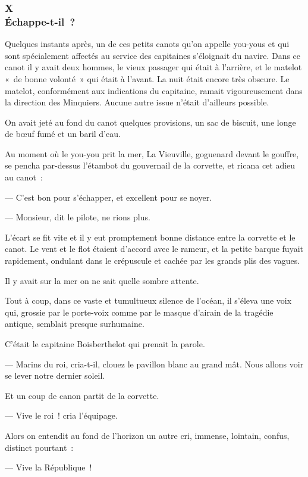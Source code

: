 \documentclass[french,twoside]{book} %
\begin{document}
 \subsubsection[{X. Échappe-t-il ?}]{X \\
Échappe-t-il ?}
\label{p1l2c10}
\noindent Quelques instants après, un de ces petits canots qu’on appelle you-yous et qui sont spécialement affectés au service des capitaines s’éloignait du navire. Dans ce canot il y avait deux hommes, le vieux passager qui était à l’arrière, et le matelot « de bonne volonté » qui était à l’avant. La nuit était encore très obscure. Le matelot, conformément aux indications du capitaine, ramait vigoureusement dans la direction des Minquiers. Aucune autre issue n’était d’ailleurs possible.\par
On avait jeté au fond du canot quelques provisions, un sac de biscuit, une longe de bœuf fumé et un baril d’eau.\par
Au moment où le you-you prit la mer, La Vieuville, goguenard devant le gouffre, se pencha par-dessus l’étambot du gouvernail de la corvette, et ricana cet adieu au canot :\par
— C’est bon pour s’échapper, et excellent pour se noyer.\par
— Monsieur, dit le pilote, ne rions plus.\par
L’écart se fit vite et il y eut promptement bonne distance entre la corvette et le canot. Le vent et  le flot étaient d’accord avec le rameur, et la petite barque fuyait rapidement, ondulant dans le crépuscule et cachée par les grands plis des vagues.\par
Il y avait sur la mer on ne sait quelle sombre attente.\par
Tout à coup, dans ce vaste et tumultueux silence de l’océan, il s’éleva une voix qui, grossie par le porte-voix comme par le masque d’airain de la tragédie antique, semblait presque surhumaine.\par
C’était le capitaine Boisberthelot qui prenait la parole.\par
— Marins du roi, cria-t-il, clouez le pavillon blanc au grand mât. Nous allons voir se lever notre dernier soleil.\par
Et un coup de canon partit de la corvette.\par
— Vive le roi ! cria l’équipage.\par
Alors on entendit au fond de l’horizon un autre cri, immense, lointain, confus, distinct pourtant :\par
— Vive la République !\par
\end{document}

